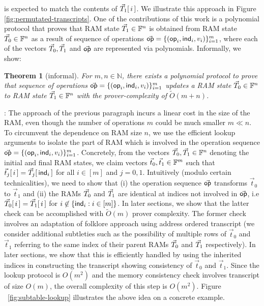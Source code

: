 \documentclass[11pt]{article}
\newtheorem{theorem}{Theorem}[section]
\begin{document}
    is expected to match the contents of $\vec{T}_1[\,i\,]$. We illustrate this approach in Figure \ref{fig:permutated-transcripts}. One of the contributions of this work is a polynomial protocol that proves that RAM state
    $\vec{T}_1\in \mathbb{F}^n$ is obtained from RAM state $\vec{T}_0\in \mathbb{F}^n$ as a result of sequence of operations $\vec{\mathsf{op}}=\{(\mathsf{op}_i,\mathsf{ind}_i,v_i)\}_{i=1}^m$, where each
    of the vectors $\vec{T}_0,\vec{T}_1$ and $\vec{\mathsf{op}}$ are represented via polynomials. Informally, we show:
    \begin{theorem}[informal]\label{thm:pp-for-ram-informal}
    For $m,n\in \mathbb{N}$, there exists a polynomial protocol to prove that sequence of operations $\vec{\mathsf{op}}=\{(\mathsf{op}_i,\mathsf{ind}_i,v_i)\}_{i=1}^m$ updates a
    RAM state $\vec{T}_0\in \mathbb{F}^n$ to RAM state $\vec{T}_1\in \mathbb{F}^n$ with the prover-complexity of $\tilde{O}(m+n)$.
    \end{theorem}

    : The approach of the previous paragraph incurs a linear cost in
    the size of the RAM, even though the number of operations $m$ could be much smaller $m\ll n$. To circumvent the
    dependence on RAM size $n$, we use the efficient lookup arguments to isolate the part of RAM which is involved
    in the operation sequence $\vec{\mathsf{op}}=\{(\mathsf{op}_i,\mathsf{ind}_i,v_i)\}_{i=1}^m$.
    Concretely, from the vectors $\vec{T}_0,\vec{T}_1\in \mathbb{F}^n$ denoting the initial and final RAM states, we claim
    vectors $\vec{t}_0, \vec{t}_1\in \mathbb{F}^m$ such that $\vec{t}_j[\,i\,] = \vec{T}_j[\,\mathsf{ind}_i\,]$ for all $i\in [m]$ and
    $j=0,1$. Intuitively (modulo certain technicalities), we need to show that (i) the operation sequence $\vec{\mathsf{op}}$
    transforms $\vec{t}_0$ to $\vec{t}_1$ and (ii) the RAMs $\vec{T}_0$ and $\vec{T}_1$ are identical at indices not
    involved in $\vec{\mathsf{op}}$, i.e $\vec{T}_0[\,i\,]=\vec{T}_1[\,i\,]$ for $i\not\in \{\mathsf{ind}_i: i\in [m]\}$. In later
    sections, we show that the latter check can be accomplished with $\tilde{O}(m)$ prover complexity. The former
    check involves an adaptation of folklore approach using address ordered transcript (we consider additional subtleties such
    as the possibility of multiple rows of $\vec{t}_0$ and $\vec{t}_1$ referring to the same index of their parent RAMs $\vec{T}_0$ and
    $\vec{T}_1$ respectively).
    In later sections, we show that this is efficiently handled by using the inherited indices in constructing the transcript showing
    consistency of $\vec{t}_0$ and $\vec{t}_1$. Since the lookup protocol is $O(m^2)$ and the memory consistency check involves transcript
    of size $O(m)$, the overall complexity of this step is $O(m^2)$. Figure ~\ref{fig:subtable-lookup} illustrates the above idea on
    a concrete example.
\end{document}
